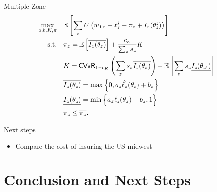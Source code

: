 \documentclass{beamer}
\begin{document}
\begin{frame}{Multiple Zone}
    \begin{align}
        \max_{a,b,K,\pi} &\quad \mathbb{E}\left [ \sum_z U\left ( w_{0,z} -\ell_z^j -\pi_z + I_z(\theta^j_z) \right ) \right ]\label{eq-33}\\
        \text{s.t.} &\quad \pi_z  = \mathbb{E}\left [ \overline{I_z(\theta_z)} \right ] + \frac{c_{\kappa}}{\sum_z s_z}  K\\
        &\quad K = {\sf CVaR}_{1-\epsilon_K} \left ( \sum_z s_z\overline{I_z(\theta_z)} \right ) - \mathbb{E}\left [ \sum_{z} s_{z}\underline{I_{z}(\theta_{z'})} \right ] \label{eq-32}\\
        &\quad \overline{I_z(\theta_z)} = \max \left \{0,a_z\hat{\ell_z}(\theta_z) + b_z \right \} \nonumber\\
        &\quad\underline{I_z(\theta_z)} = \min \left \{a_z\hat{\ell_z}(\theta_z)+b_z,1 \right \} \nonumber\\
        &\quad\pi_z \leq \overline{\pi_z} \nonumber.
      \end{align}
    
\end{frame}

\begin{frame}{Next steps}
    \begin{itemize}
        \setlength\itemsep{2em}
        \item Compare the cost of insuring the US midwest
    \end{itemize}
\end{frame}












\section{Conclusion and Next Steps}
\end{document}

